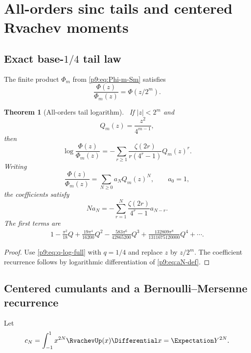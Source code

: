 \documentclass[11pt]{article}
\numberwithin{equation}{section}
\newtheorem{theorem}{Theorem}[section]
\theoremstyle{definition}
\theoremstyle{remark}
\begin{document}
\section{All-orders sinc tails and centered Rvachev moments}
\label{p9:sec:tail-moments}

\subsection{Exact base-$1/4$ tail law}
The finite product $\Phi_m$ from \eqref{p9:eq:Phi-m-Sm} satisfies
\begin{equation}
 \frac{\Phi(z)}{\Phi_m(z)}=\Phi(z/2^m).                    \label{p9:eq:tail-shell}
\end{equation}

\begin{theorem}[All-orders tail logarithm]\label{p9:thm:tail-log}
\statusN\ If $|z|<2^m$ and
\begin{equation}
 Q_m(z)=\frac{z^2}{4^{m-1}},                               \label{p9:eq:Qm}
\end{equation}
then
\begin{equation}
 \boxed{
 \log\frac{\Phi(z)}{\Phi_m(z)}
 =-\sum_{r\ge1}\frac{\zeta(2r)}{r(4^r-1)}Q_m(z)^r.}       \label{p9:eq:tail-log}
\end{equation}
Writing
\begin{equation}
 \frac{\Phi(z)}{\Phi_m(z)}=\sum_{N\ge0}a_NQ_m(z)^N,
 \qquad a_0=1,                                             \label{p9:eq:aN-def}
\end{equation}
the coefficients satisfy
\begin{equation}
 \boxed{
 Na_N=-\sum_{r=1}^{N}\frac{\zeta(2r)}{4^r-1}a_{N-r}.}     \label{p9:eq:aN-rec}
\end{equation}
The first terms are
\begin{align}
 1-\frac{\pi^2}{18}Q
 +\frac{19\pi^4}{16200}Q^2
 -\frac{583\pi^6}{42865200}Q^3
 +\frac{132809\pi^8}{1311675120000}Q^4+\cdots.            \label{p9:eq:tail-first}
\end{align}
\end{theorem}

\begin{proof}
Use \eqref{p9:eq:q-log-full} with $q=1/4$ and replace $z$ by $z/2^m$.
The coefficient recurrence follows by logarithmic differentiation of
\eqref{p9:eq:aN-def}.
\end{proof}

\subsection{Centered cumulants and a Bernoulli--Mersenne recurrence}
Let
\begin{equation}
 c_N=\int_{-1}^{1}x^{2N}\RvachevUp(x)\Differential x=\Expectation Y^{2N}.             \label{p9:eq:cN}
\end{equation}
\end{document}
